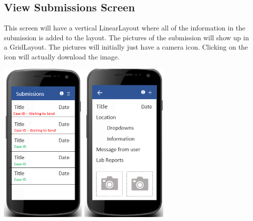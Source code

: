 \documentclass[onecolumn, draftclsnofoot,10pt, compsoc]{IEEEtran}
\begin{document}
\subsection{View Submissions Screen}
This screen will have a vertical LinearLayout where all of the information in the submission is added to the layout. The pictures of the submission will show up in a GridLayout. The pictures will initially just have a camera icon. Clicking on the icon will actually download the image.
\newline
\begin{center}
\includegraphics[height=8cm]{submissionscreen.png}
\includegraphics[height=8cm]{detailsscreen.png}
\end{center}

\end{document}
